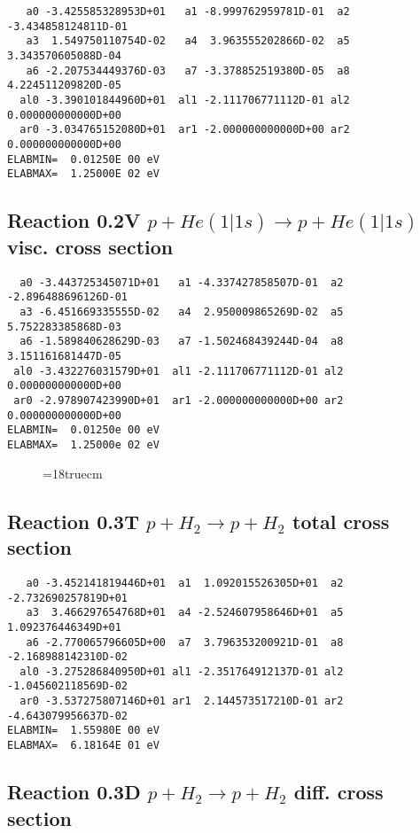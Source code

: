 \begin{verbatim}
   a0 -3.425585328953D+01   a1 -8.999762959781D-01  a2 -3.434858124811D-01
   a3  1.549750110754D-02   a4  3.963555202866D-02  a5  3.343570605088D-04
   a6 -2.207534449376D-03   a7 -3.378852519380D-05  a8  4.224511209820D-05
  al0 -3.390101844960D+01  al1 -2.111706771112D-01 al2  0.000000000000D+00
  ar0 -3.034765152080D+01  ar1 -2.000000000000D+00 ar2  0.000000000000D+00
ELABMIN=  0.01250E 00 eV
ELABMAX=  1.25000E 02 eV
\end{verbatim}


\subsection{
Reaction 0.2V   $ p + He(1|1s) \rightarrow p + He (1|1s) $visc. cross section
}


\begin{verbatim}
  a0 -3.443725345071D+01   a1 -4.337427858507D-01  a2 -2.896488696126D-01
  a3 -6.451669335555D-02   a4  2.950009865269D-02  a5  5.752283385868D-03
  a6 -1.589840628629D-03   a7 -1.502468439244D-04  a8  3.151161681447D-05
 al0 -3.432276031579D+01  al1 -2.111706771112D-01 al2  0.000000000000D+00
 ar0 -2.978907423990D+01  ar1 -2.000000000000D+00 ar2  0.000000000000D+00
ELABMIN=  0.01250e 00 eV
ELABMAX=  1.25000e 02 eV
\end{verbatim}


\begin{figure} \label{0.2}
\epsfxsize=18truecm
\end{figure}
\newpage

\subsection{
Reaction 0.3T    $p + H_2 \rightarrow p + H_2 $  total cross section
}


\begin{verbatim}
   a0 -3.452141819446D+01  a1  1.092015526305D+01  a2 -2.732690257819D+01
   a3  3.466297654768D+01  a4 -2.524607958646D+01  a5  1.092376446349D+01
   a6 -2.770065796605D+00  a7  3.796353200921D-01  a8 -2.168988142310D-02
  al0 -3.275286840950D+01 al1 -2.351764912137D-01 al2 -1.045602118569D-02
  ar0 -3.537275807146D+01 ar1  2.144573517210D-01 ar2 -4.643079956637D-02
ELABMIN=  1.55980E 00 eV
ELABMAX=  6.18164E 01 eV
\end{verbatim}

\subsection{
Reaction 0.3D   $ p + H_2 \rightarrow p + H_2 $  diff. cross section
}


